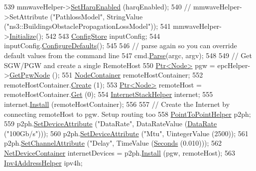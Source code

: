 \begin{DoxyCode}
{539   mmwaveHelper->\hyperlink{classns3_1_1MmWaveHelper_af211a02952ab5f4eabe0219cf53e7e1c}{SetHarqEnabled} (harqEnabled);
540 \textcolor{comment}{//  mmwaveHelper->SetAttribute ("PathlossModel", StringValue
       ("ns3::BuildingsObstaclePropagationLossModel"));}
541   mmwaveHelper->\hyperlink{classns3_1_1Object_af4411cb29971772fcd09203474a95078}{Initialize}();
542 
543   \hyperlink{classns3_1_1ConfigStore}{ConfigStore} inputConfig;
544   inputConfig.\hyperlink{classns3_1_1ConfigStore_a0a6137574d7c847c3823af8b9d1bb886}{ConfigureDefaults}();
545 
546   \textcolor{comment}{// parse again so you can override default values from the command line}
547   cmd.\hyperlink{classns3_1_1CommandLine_a5c10b85b3207e5ecb48d907966923156}{Parse}(argc, argv);
548 
549    \textcolor{comment}{// Get SGW/PGW and create a single RemoteHost }
550   \hyperlink{classns3_1_1Ptr}{Ptr<Node>} pgw = epcHelper->\hyperlink{classns3_1_1MmWavePointToPointEpcHelper_a586f072ee5b09376531ba605b3fed05f}{GetPgwNode} ();
551   \hyperlink{classns3_1_1NodeContainer}{NodeContainer} remoteHostContainer;
552   remoteHostContainer.\hyperlink{classns3_1_1NodeContainer_a787f059e2813e8b951cc6914d11dfe69}{Create} (1);
553   \hyperlink{classns3_1_1Ptr}{Ptr<Node>} remoteHost = remoteHostContainer.\hyperlink{classns3_1_1NodeContainer_a9ed96e2ecc22e0f5a3d4842eb9bf90bf}{Get} (0);
554   \hyperlink{classns3_1_1InternetStackHelper}{InternetStackHelper} internet;
555   internet.\hyperlink{classns3_1_1InternetStackHelper_a6645b412f31283d2d9bc3d8a95cebbc0}{Install} (remoteHostContainer);
556 
557   \textcolor{comment}{// Create the Internet by connecting remoteHost to pgw. Setup routing too}
558   \hyperlink{classns3_1_1PointToPointHelper}{PointToPointHelper} p2ph;
559   p2ph.\hyperlink{classns3_1_1PointToPointHelper_a4577f5ab8c387e5528af2e0fbab1152e}{SetDeviceAttribute} (\textcolor{stringliteral}{"DataRate"}, DataRateValue (\hyperlink{classns3_1_1DataRate}{DataRate} (\textcolor{stringliteral}{"100Gb/s"})));
560   p2ph.\hyperlink{classns3_1_1PointToPointHelper_a4577f5ab8c387e5528af2e0fbab1152e}{SetDeviceAttribute} (\textcolor{stringliteral}{"Mtu"}, UintegerValue (2500));
561   p2ph.\hyperlink{classns3_1_1PointToPointHelper_a6b5317fd17fb61e5a53f8d66a90b63b9}{SetChannelAttribute} (\textcolor{stringliteral}{"Delay"}, TimeValue (\hyperlink{group__timecivil_ga33c34b816f8ff6628e33d5c8e9713b9e}{Seconds} (0.010)));
562   \hyperlink{classns3_1_1NetDeviceContainer}{NetDeviceContainer} internetDevices = p2ph.\hyperlink{classns3_1_1PointToPointHelper_ab9162fea3e88722666fed1106df1f9ec}{Install} (pgw, remoteHost);
563   \hyperlink{classns3_1_1Ipv4AddressHelper}{Ipv4AddressHelper} ipv4h;
}
\end{DoxyCode}
